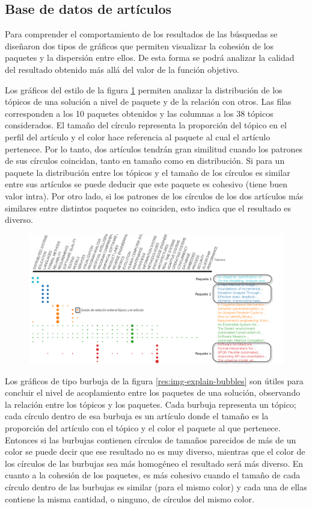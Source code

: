 \subsection{Base de datos de artículos}
Para comprender el comportamiento de los resultados de las búsquedas se diseñaron dos tipos de gráficos que permiten visualizar la cohesión de los paquetes y la dispersión entre ellos. De esta forma se podrá analizar la calidad del resultado obtenido más allá del valor de la función objetivo.

Los gráficos del estilo de la figura \ref{res:img-explain-bars} permiten analizar la distribución de los tópicos de una solución a nivel de paquete y de la relación con otros. Las filas corresponden a los 10 paquetes obtenidos y las columnas a los 38 tópicos considerados. El tamaño del círculo representa la proporción del tópico en el perfil del artículo y el color hace referencia al paquete al cual el artículo pertenece. Por lo tanto, dos artículos tendrán gran similitud cuando los patrones de sus círculos coincidan, tanto en tamaño como en distribución. Si para un paquete la distribución entre los tópicos y el tamaño de los círculos es similar entre sus artículos se puede deducir que este paquete es cohesivo (tiene buen valor intra). Por otro lado, si los patrones de los círculos de los dos artículos más similares entre distintos paquetes no coinciden, esto indica que el resultado es diverso.
\begin{figure}[H]
  \centering
    \includegraphics[width=1\textwidth]{img/explain-bars.png}
  \caption{}
  \label{res:img-explain-bars}
\end{figure}

Los gráficos de tipo burbuja de la figura \ref{res:img-explain-bubbles} son útiles para concluir el nivel de acoplamiento entre los paquetes de una solución, observando la relación entre los tópicos y los paquetes. Cada burbuja representa un tópico; cada círculo dentro de esa burbuja es un artículo donde el tamaño es la proporción del artículo con el tópico y el color el paquete al que pertenece. Entonces si las burbujas contienen círculos de tamaños parecidos de más de un color se puede decir que ese resultado no es muy diverso, mientras que el color de los círculos de las burbujas sea más homogéneo el resultado será más diverso. En cuanto a la cohesión de los paquetes, es más cohesivo cuando el tamaño de cada círculo dentro de las burbujas es similar (para el mismo color) y cada una de ellas contiene la misma cantidad, o ninguno, de círculos del mismo color.

